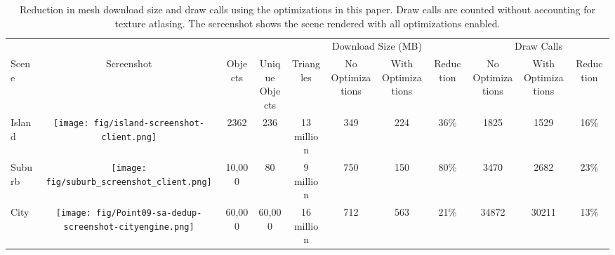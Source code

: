 {\setlength{\tabcolsep}{.1667em}
\begin{table*}
\centering
{\small
\begin{tabular}{lccccccc|ccc}
\toprule[2pt]
 & & & & \multicolumn{4}{c}{Download Size (MB)} &  \multicolumn{3}{c}{Draw Calls} \\
\cmidrule{5-8} \cmidrule{9-11}
 Scene         & Screenshot & Objects & \specialcell{Unique\\Objects} & Triangles  & \specialcell{No\\Optimizations} & \specialcell{With\\Optimizations} & Reduction & \specialcell{No\\Optimizations} & \specialcell{With\\Optimizations} & Reduction   \\ \hline
\addlinespace[0.1em]
 Island & \texttt{[image: fig/island-screenshot-client.png]}  & 2362 & 236  & 13 million  &  349   &  224 & 36\%  & 1825 & 1529 & 16\% \\
\addlinespace[0.1em]
 Suburb & \texttt{[image: fig/suburb\_screenshot\_client.png]}  & 10,000 & 80  & 9 million  &  750   &  150 & 80\%  & 3470 & 2682 & 23\% \\
\addlinespace[0.1em]
 City  &  \texttt{[image: fig/Point09-sa-dedup-screenshot-cityengine.png]}  &60,000 & 60,000  & 16 million   &  712   &  563 & 21\%  & 34872 & 30211 & 13\% \\
\bottomrule[2pt]
\end{tabular}
}
\caption{Reduction in mesh download size and draw calls using
the optimizations in this paper. Draw calls are counted without
accounting for texture atlasing. The screenshot shows the scene
rendered with all optimizations enabled.}

\label{tab:optimization_benefits}
\vspace{-8pt}
\end{table*}
}

